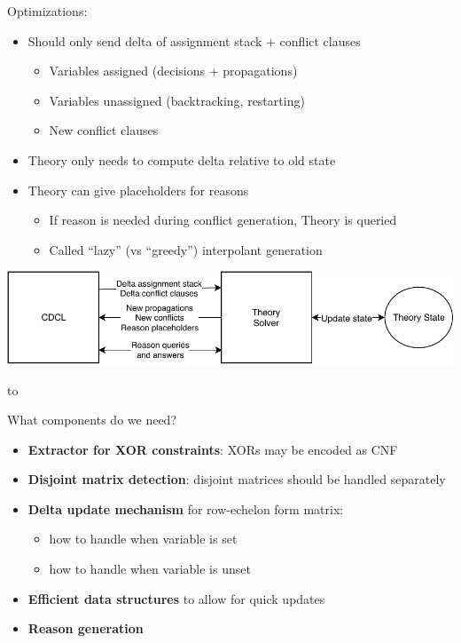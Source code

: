 \documentclass[aspectratio=196]{slides}
\def\TITLE#1{\hbox to \linewidth{\large #1\hfill}}
\def\BOTTOM{\vfill\newpage}
\def\SLIDE#1{\BOTTOM\TITLE{#1}}
\begin{document}
Optimizations:
\begin{itemize}
\item Should only send delta of assignment stack + conflict clauses
\begin{itemize}
\item Variables assigned (decisions + propagations)
\item Variables unassigned (backtracking, restarting)
\item New conflict clauses
\end{itemize}
\item Theory only needs to compute delta relative to old state
\item Theory can give placeholders for reasons
\begin{itemize}
\item If reason is needed during conflict generation, Theory is queried
\item Called ``lazy'' (vs ``greedy'') interpolant generation
\end{itemize}
\end{itemize}
\vspace{2ex}
\begin{center}
\includegraphics[width=29cm]{CDCL-T-delta}
\end{center}

\vfill
\newpage
\SLIDE{CDCL(T) Gauss-Jordan Elimination: Ingredients}

What components do we need?
\begin{itemize}
\item \textbf{Extractor for XOR constraints}: XORs may be encoded as CNF
\item \textbf{Disjoint matrix detection}: disjoint matrices should be handled separately
\item \textbf{Delta update mechanism} for row-echelon form matrix:
\begin{itemize}
    \item how to handle when variable is set
    \item how to handle when variable is unset
\end{itemize}
\item \textbf{Efficient data structures} to allow for quick updates
\item \textbf{Reason generation}
\end{itemize}
\vfill
\newpage
\end{document}
